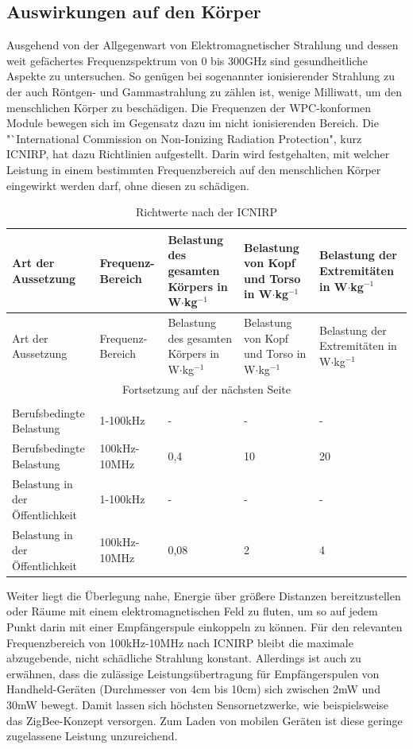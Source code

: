 \documentclass[12pt]{scrreprt} %
\begin{document}
\subsection{Auswirkungen auf den Körper}
Ausgehend von der Allgegenwart von Elektromagnetischer Strahlung und dessen weit gefächertes Frequenzspektrum von 0 bis 300GHz sind gesundheitliche Aspekte zu untersuchen. So genügen bei sogenannter ionisierender Strahlung zu der auch Röntgen- und Gammastrahlung zu zählen ist, wenige Milliwatt, um den menschlichen Körper zu beschädigen. Die Frequenzen der WPC-konformen Module bewegen sich im Gegensatz dazu im nicht ionisierenden Bereich. Die "`International Commission on Non-Ionizing Radiation Protection", kurz ICNIRP, hat dazu Richtlinien aufgestellt\citep{ICNIRP}. Darin wird festgehalten, mit welcher Leistung in einem bestimmten Frequenzbereich auf den menschlichen Körper eingewirkt werden darf, ohne diesen zu schädigen.
\setlongtables
\begin{longtable}{| p{} |p{} | p{} |p{} |p{} |}
\hline
Art der Aussetzung &Frequenz-Bereich&Belastung des gesamten Körpers in W$\cdot$kg$^{-1}$ &Belastung von Kopf und Torso in W$\cdot$kg$^{-1}$ & Belastung der Extremitäten in W$\cdot$kg$^{-1}$ \\
\hline
\hline
\endfirsthead
\hline
Art der Aussetzung &Frequenz-Bereich&Belastung des gesamten Körpers in W$\cdot$kg$^{-1}$ &Belastung von Kopf und Torso in W$\cdot$kg$^{-1}$ & Belastung der Extremitäten in W$\cdot$kg$^{-1}$ \\
\hline
\hline
\endhead
\hline
\multicolumn{5}{|c|}{Fortsetzung auf der nächsten Seite}\\
\hline
\endfoot
\hline \hline
\caption{Richtwerte nach der ICNIRP\citep{ICNIRP}}\\
\endlastfoot
\hline
\label{strahlung}%
Berufsbedingte Belastung&1-100kHz&-&-&-\\
\hline
Berufsbedingte Belastung&100kHz-10MHz&0,4&10&20\\
\hline
Belastung in der Öffentlichkeit&1-100kHz&-&-&-\\
\hline
Belastung in der Öffentlichkeit&100kHz-10MHz&0,08&2&4
\end{longtable}
Weiter liegt die Überlegung nahe, Energie über größere Distanzen bereitzustellen oder Räume mit einem elektromagnetischen Feld zu fluten, um so auf jedem Punkt darin mit einer Empfängerspule einkoppeln zu können. Für den relevanten Frequenzbereich von 100kHz-10MHz nach ICNIRP bleibt die maximale abzugebende, nicht schädliche Strahlung konstant. Allerdings ist auch zu erwähnen, dass die zulässige Leistungsübertragung für Empfängerspulen von Handheld-Geräten (Durchmesser von 4cm bis 10cm) sich zwischen 2mW und 30mW bewegt. Damit lassen sich höchsten Sensornetzwerke, wie beispielsweise das ZigBee-Konzept versorgen. Zum Laden von mobilen Geräten ist diese geringe zugelassene Leistung unzureichend.   
\end{document}
